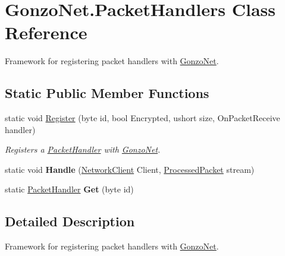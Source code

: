 \hypertarget{class_gonzo_net_1_1_packet_handlers}{\section{Gonzo\+Net.\+Packet\+Handlers Class Reference}
\label{class_gonzo_net_1_1_packet_handlers}
}


Framework for registering packet handlers with \hyperlink{namespace_gonzo_net}{Gonzo\+Net}.  


\subsection*{Static Public Member Functions}
\begin{DoxyCompactItemize}
\item 
static void \hyperlink{class_gonzo_net_1_1_packet_handlers_a2e446f9b363715193f38ddbc2a2b37cf}{Register} (byte id, bool Encrypted, ushort size, On\+Packet\+Receive handler)
\begin{DoxyCompactList}\small\item\em Registers a \hyperlink{class_gonzo_net_1_1_packet_handler}{Packet\+Handler} with \hyperlink{namespace_gonzo_net}{Gonzo\+Net}. \end{DoxyCompactList}\item 
\hypertarget{class_gonzo_net_1_1_packet_handlers_a7e89fee1431ffb1defe559acff31d804}{static void {\bfseries Handle} (\hyperlink{class_gonzo_net_1_1_network_client}{Network\+Client} Client, \hyperlink{class_gonzo_net_1_1_processed_packet}{Processed\+Packet} stream)}\label{class_gonzo_net_1_1_packet_handlers_a7e89fee1431ffb1defe559acff31d804}

\item 
\hypertarget{class_gonzo_net_1_1_packet_handlers_a4b6771ab696323cea719696ca279507e}{static \hyperlink{class_gonzo_net_1_1_packet_handler}{Packet\+Handler} {\bfseries Get} (byte id)}\label{class_gonzo_net_1_1_packet_handlers_a4b6771ab696323cea719696ca279507e}

\end{DoxyCompactItemize}


\subsection{Detailed Description}
Framework for registering packet handlers with \hyperlink{namespace_gonzo_net}{Gonzo\+Net}. 



